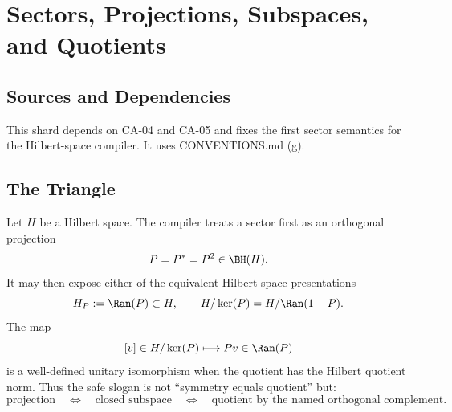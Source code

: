 
\section{Sectors, Projections, Subspaces, and Quotients}
\label{sec:sectors-projections-quotients}

\subsection{Sources and Dependencies}

This shard depends on CA-04 and CA-05 and fixes the first sector semantics for
the Hilbert-space compiler.  It uses CONVENTIONS.md (g).


\subsection{The Triangle}

Let \(H\) be a Hilbert space.  The compiler treats a sector first as an
orthogonal projection
\[
  P=P^*=P^2\in\BH(H).
\]
It may then expose either of the equivalent Hilbert-space presentations
\[
  H_P:=\Ran(P)\subset H,\qquad
  H/\ker(P)=H/\Ran(1-P).
\]
The map
\[
  [v]\in H/\ker(P)\longmapsto Pv\in \Ran(P)
\]
is a well-defined unitary isomorphism when the quotient has the Hilbert quotient
norm.  Thus the safe slogan is not ``symmetry equals quotient'' but:
\[
  \text{projection}\quad\Longleftrightarrow\quad
  \text{closed subspace}\quad\Longleftrightarrow\quad
  \text{quotient by the named orthogonal complement}.
\]

